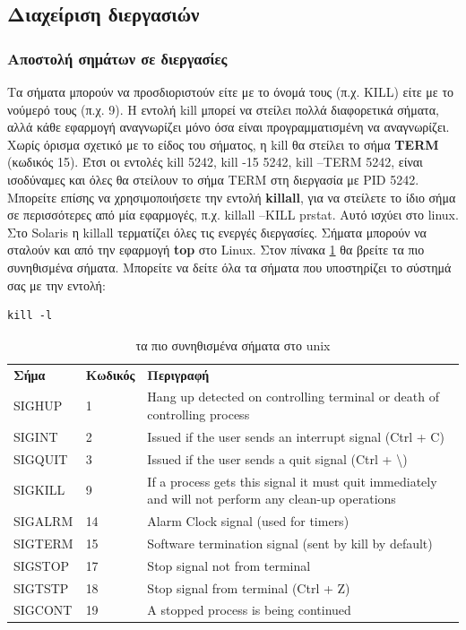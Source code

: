 \subsection{Διαχείριση διεργασιών}


\subsubsection*{Αποστολή σημάτων σε διεργασίες}

Τα σήματα μπορούν να προσδιοριστούν είτε με το όνομά τους (π.χ. KILL) είτε με το νούμερό τους (π.χ. 9). Η εντολή kill μπορεί να στείλει
πολλά διαφορετικά σήματα, αλλά κάθε εφαρμογή αναγνωρίζει μόνο όσα είναι προγραμματισμένη να αναγνωρίζει. Χωρίς όρισμα σχετικό με το είδος
του σήματος, η kill θα στείλει το σήμα \textbf{TERM} (κωδικός 15). Έτσι οι εντολές kill 5242, kill -15 5242, kill –TERM 5242, είναι
ισοδύναμες και όλες
θα στείλουν το σήμα TERM στη διεργασία με PID 5242. 
Μπορείτε επίσης να χρησιμοποιήσετε την εντολή \textbf{killall}, για να στείλετε το ίδιο σήμα σε περισσότερες από μία εφαρμογές, π.χ.
killall –KILL prstat. Αυτό ισχύει στο linux. Στο Solaris η killall τερματίζει όλες τις ενεργές διεργασίες. 
Σήματα μπορούν να σταλούν και από την εφαρμογή \textbf{top} στο Linux. Στον πίνακα \ref{tab:signals} θα βρείτε τα πιο συνηθισμένα σήματα. Μπορείτε να δείτε όλα τα σήματα που υποστηρίζει το σύστημά σας με την εντολή: 
\begin{lstlisting}
kill -l
\end{lstlisting}

\begin{center}
	\begin{table}[h]
		\small
		\begin{tabularx}{\textwidth}{l|l|X}
			\rowcolor[gray]{0.9}
			\textbf{Σήμα} & \textbf{Κωδικός} &  \textbf{Περιγραφή} \\
			SIGHUP  &1	&Hang up detected on controlling terminal or death of controlling process \\
			SIGINT	&2	&Issued if the user sends an interrupt signal (Ctrl + C)\\
			SIGQUIT	&3	&Issued if the user sends a quit signal (Ctrl + \textbackslash)\\
			SIGKILL	&9	&If a process gets this signal it must quit immediately and will not perform any clean-up operations\\
			SIGALRM	&14	&Alarm Clock signal (used for timers)\\
			SIGTERM	&15	&Software termination signal (sent by kill by default)\\
			SIGSTOP	&17	&Stop signal not from terminal\\
			SIGTSTP	&18	&Stop signal from terminal (Ctrl + Z)\\
			SIGCONT	&19	&A stopped process is being continued\\
		\end{tabularx}  
		\caption{τα πιο συνηθισμένα σήματα στο unix} 
		\label{tab:signals}          
	\end{table}
\end{center}






